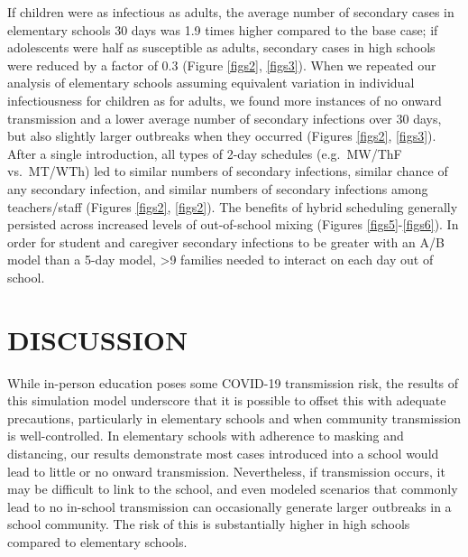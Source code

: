 \documentclass[
]{article}
\begin{document}
If children were as infectious as adults, the average number of
secondary cases in elementary schools 30 days was 1.9 times higher
compared to the base case; if adolescents were half as susceptible as
adults, secondary cases in high schools were reduced by a factor of 0.3
(Figure \ref{figs2}, \ref{figs3}). When we repeated our analysis of
elementary schools assuming equivalent variation in individual
infectiousness for children as for adults, we found more instances of no
onward transmission and a lower average number of secondary infections
over 30 days, but also slightly larger outbreaks when they occurred
(Figures \ref{figs2}, \ref{figs3}). After a single introduction, all
types of 2-day schedules (e.g.~MW/ThF vs.~MT/WTh) led to similar numbers
of secondary infections, similar chance of any secondary infection, and
similar numbers of secondary infections among teachers/staff (Figures
\ref{figs2}, \ref{figs2}). The benefits of hybrid scheduling generally
persisted across increased levels of out-of-school mixing (Figures
\ref{figs5}-\ref{figs6}). In order for student and caregiver secondary
infections to be greater with an A/B model than a 5-day model,
\textgreater9 families needed to interact on each day out of school.

\hypertarget{discussion}{%
\section{DISCUSSION}\label{discussion}}

While in-person education poses some COVID-19 transmission risk, the
results of this simulation model underscore that it is possible to
offset this with adequate precautions, particularly in elementary
schools and when community transmission is well-controlled. In
elementary schools with adherence to masking and distancing, our results
demonstrate most cases introduced into a school would lead to little or
no onward transmission. Nevertheless, if transmission occurs, it may be
difficult to link to the school, and even modeled scenarios that
commonly lead to no in-school transmission can occasionally generate
larger outbreaks in a school community. The risk of this is
substantially higher in high schools compared to elementary schools.
\end{document}

